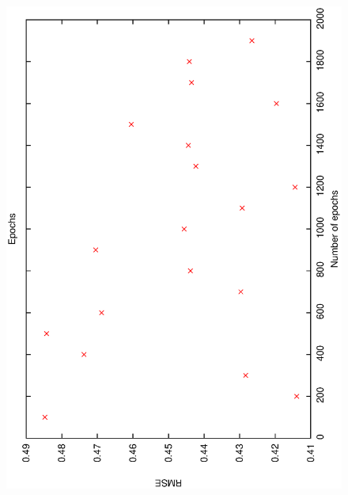 \documentclass[12pt,a4,notitlepage]{report}
\renewcommand{\_}{\texttt{\symbol{95}}}
\newcommand{\<}{\texttt{\symbol{60}}}
\renewcommand{\>}{\texttt{\symbol{62}}}
\begin{document}
\begin{figure}
\includegraphics[scale=0.3,angle=-90]{results/neural_err/n_epochs.ps}

\end{figure}
\end{document}
